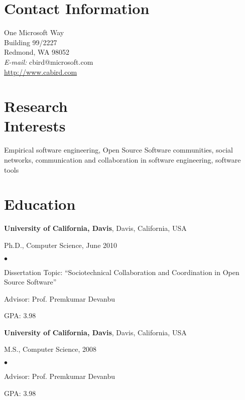 \documentclass[margin,line,article,letterpaper]{res}
\newenvironment{list1}{
  \begin{list}{}{%
      \setlength{\itemsep}{0in}
      \setlength{\parsep}{0in} \setlength{\parskip}{0in}
      \setlength{\topsep}{0in} \setlength{\partopsep}{0in} 
      \setlength{\leftmargin}{0.17in}}}{\end{list}}
\newenvironment{list2}{
  \begin{list}{$\bullet$}{%
      \setlength{\itemsep}{0in}
      \setlength{\parsep}{0in} \setlength{\parskip}{0in}
      \setlength{\topsep}{0in} \setlength{\partopsep}{0in} 
      \setlength{\leftmargin}{0.2in}}}{\end{list}}
\begin{document}



\begin{resume}
\section{Contact Information}
\vspace{.05in}
One Microsoft Way\\
Building 99/2227\\
Redmond, WA 98052\\
{\it E-mail:}  cbird@microsoft.com\\
\url{http://www.cabird.com}
 
\section{Research \\
Interests}
Empirical software engineering, Open Source Software communities, social networks, 
communication and collaboration in software engineering, software tools

\section{Education}
\textbf{University of California, Davis}, Davis, California, USA
\begin{list1}
\item Ph.D., Computer Science, June 2010
\begin{list2}
\vspace*{.05in}
\item Dissertation Topic:  ``Sociotechnical Collaboration and Coordination in Open Source Software'' 
\item Advisor:  Prof. Premkumar Devanbu
\item GPA: 3.98
\end{list2}
\end{list1}

\textbf{University of California, Davis}, Davis, California, USA
\begin{list1}
\item M.S., Computer Science, 2008
\begin{list2}
\vspace*{.05in}
\item Advisor:  Prof. Premkumar Devanbu
\item GPA: 3.98
\end{list2}
\end{list1}


\end{resume}
\end{document}

